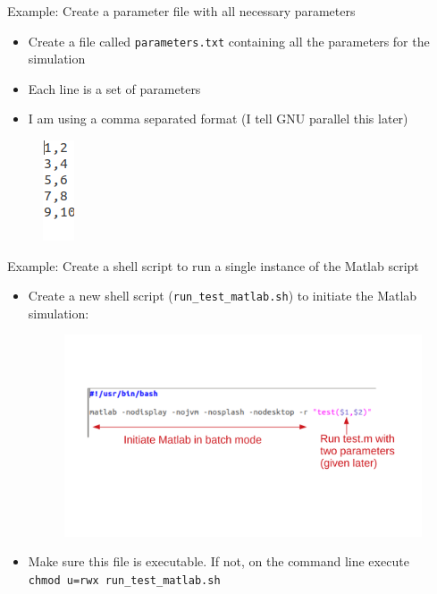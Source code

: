 \documentclass{beamer}
\begin{document}
\begin{frame}{Example: Create a parameter file with all necessary parameters}
\begin{itemize}
\item Create a file called \texttt{parameters.txt} containing all the parameters for the simulation
\item Each line is a set of parameters
\item I am using a comma separated format (I tell GNU parallel this later)
\end{itemize}
\begin{figure}
\includegraphics[width=.05\linewidth]{figures/parameter_file.png}
\end{figure}
\end{frame}

\begin{frame}{Example: Create a shell script to run a single instance of the Matlab script}
\begin{itemize}
	\item Create a new shell script (\texttt{run\_test\_matlab.sh}) to initiate the Matlab simulation:
\begin{figure}
\includegraphics[clip,trim=0in 2in 0in 2in,width=0.8\linewidth]{figures/run_matlab_sh_annotated.pdf}
\end{figure}
\item Make sure this file is executable. If not, on the command line execute \\ \texttt{chmod u=rwx run\_test\_matlab.sh}
\end{itemize}
\end{frame}
\end{document}
